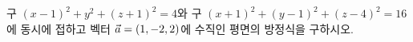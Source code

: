 구 $(x-1)^2+y^2+(z+1)^2=4$와 구 $(x+1)^2+(y-1)^2+(z-4)^2=16$에 동시에 접하고 벡터 $\vec{a}=(1{,}\mkern3mu\mathopen{}-2{,}\mkern3mu\mathopen{}2)$에 수직인 평면의 방정식을 구하시오.
